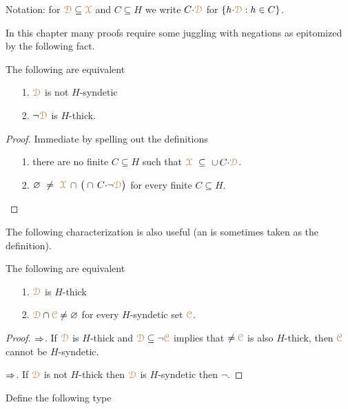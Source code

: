 Notation: for ${\color{brown}\EuScript D}\subseteq{\color{brown}\EuScript X}$ and $C\subseteq H$ we write \emph{$C{\cdot}{\color{brown}\EuScript D}$\/} for $\{h{\cdot}{\color{brown}\EuScript D}: h\in C\}$.

In this chapter many proofs require some juggling with negations as epitomized by the following fact.

\begin{fact}\label{fact_fip}
  The following are equivalent
  \begin{itemize}
    \item[1.] ${\color{brown}\EuScript D}$ is not $H$-syndetic
    \item[2.] $\neg{\color{brown}\EuScript D}$ is $H$-thick.
  \end{itemize}
\end{fact}

\begin{proof}
  Immediate by spelling out the definitions
  \begin{itemize}
    \item[1.] there are no finite $C\subseteq H$ such that ${\color{brown}\EuScript X}\ \subseteq\ \cup\, C{\cdot}{\color{brown}\EuScript D}$.
    \item[2.] $\varnothing\ \neq\ {\color{brown}\EuScript X}\,\cap\,\big(\cap\, C{\cdot}\neg{\color{brown}\EuScript D}\big)$ for every finite $C\subseteq H$.\qedhere
  \end{itemize} 
\end{proof}

The following characterization is also useful (an is sometimes taken as the definition).

\begin{corollary}\label{fact_fip2}
  The following are equivalent
  \begin{itemize}
    \item[1.] ${\color{brown}\EuScript D}$ is $H$-thick
    \item[2.] ${\color{brown}\EuScript D}\cap{\color{brown}\EuScript C}\neq\varnothing$ for every $H$-syndetic set ${\color{brown}\EuScript C}$.
  \end{itemize}
\end{corollary}

\begin{proof}
  $\Rightarrow$. 
  If ${\color{brown}\EuScript D}$ is $H$-thick and ${\color{brown}\EuScript D}\subseteq\neg{\color{brown}\EuScript C}$ implies that $\neq{\color{brown}\EuScript C}$ is also $H$-thick, then ${\color{brown}\EuScript C}$ cannot be $H$-syndetic.

  $\Rightarrow$. 
  If ${\color{brown}\EuScript D}$ is not $H$-thick then ${\color{brown}\EuScript D}$ is $H$-syndetic then $\neg$.
\end{proof}

Define the following type


